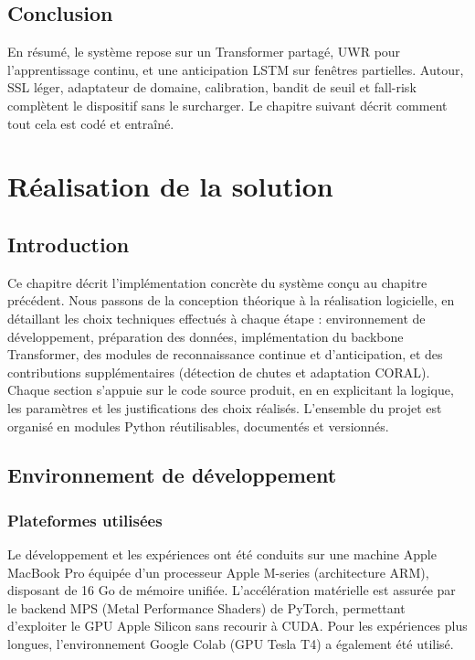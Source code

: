 \documentclass[a4paper,12pt]{report}
\begin{document}
\section{Conclusion}

En résumé, le système repose sur un Transformer partagé, UWR pour l'apprentissage
continu, et une anticipation LSTM sur fenêtres partielles. Autour, SSL léger,
adaptateur de domaine, calibration, bandit de seuil et fall-risk complètent
le dispositif sans le surcharger. Le chapitre suivant décrit comment tout
cela est codé et entraîné.



\clearpage
\chapter{Réalisation de la solution}
\label{ch:10-Realisation}

\section{Introduction}

Ce chapitre décrit l'implémentation concrète du système conçu au chapitre précédent. Nous passons de la conception théorique à la réalisation logicielle, en détaillant les choix techniques effectués à chaque étape : environnement de développement, préparation des données, implémentation du backbone Transformer, des modules de reconnaissance continue et d'anticipation, et des contributions supplémentaires (détection de chutes et adaptation CORAL). Chaque section s'appuie sur le code source produit, en en explicitant la logique, les paramètres et les justifications des choix réalisés. L'ensemble du projet est organisé en modules Python réutilisables, documentés et versionnés.

\section{Environnement de développement}

\subsection{Plateformes utilisées}

Le développement et les expériences ont été conduits sur une machine Apple MacBook Pro équipée d'un processeur Apple M-series (architecture ARM), disposant de 16 Go de mémoire unifiée. L'accélération matérielle est assurée par le backend MPS (Metal Performance Shaders) de PyTorch, permettant d'exploiter le GPU Apple Silicon sans recourir à CUDA. Pour les expériences plus longues, l'environnement Google Colab (GPU Tesla T4) a également été utilisé.
\end{document}
